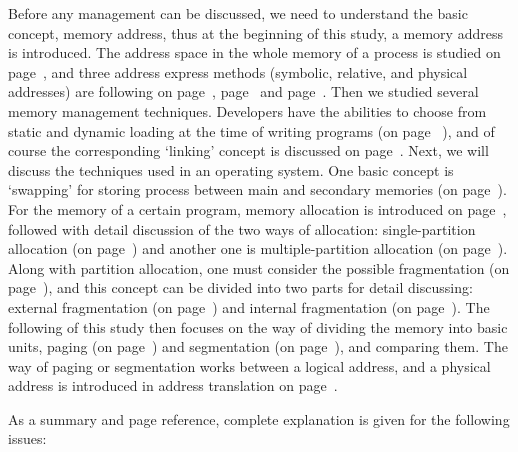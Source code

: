 \documentclass[doc,natbib,12pt]{apa6}
\begin{document}
	Before any management can be discussed, we need to understand the basic concept, memory address, thus at the beginning of this study, a memory address is introduced. The address space in the whole memory of a process is studied on page~\pageref{chp:processAddressSpace}, and three address express methods (symbolic, relative, and physical addresses)  are following on page~\pageref{chp:symbolicAddress}, page~\pageref{chp:relativeAddress} and page~\pageref{chp:physicalAddress}. Then we studied several memory management techniques. Developers have the abilities to choose from static and dynamic loading at the time of writing programs (on page~\pageref{chp:staticDynamicLoading} ), and of course the corresponding `linking' concept is discussed on page~\pageref{chp:staticDynamicLinking}. Next, we will discuss the techniques used in an operating system. One basic concept is `swapping' for storing process between main and secondary memories (on page~\pageref{chp:swapping}). For the memory of a certain program, memory allocation is introduced on page~\pageref{chp:memoryAllocation}, followed with detail discussion of the two ways of allocation: single-partition allocation (on page~\pageref{chp:singlePartitionAllocation}) and another one is multiple-partition allocation (on page~\pageref{chp:MultiplePartitionAllocation}). Along with partition allocation, one must consider the possible fragmentation (on page~\pageref{chp:fragmentation}), and this concept can be divided into two parts for detail discussing: external fragmentation (on page~\pageref{chp:externalFragmentation}) and internal fragmentation (on page~\pageref{chp:internalFragmentation}). The following of this study then focuses on the way of dividing the memory into basic units, paging (on page~\pageref{chp:paging}) and segmentation (on page~\pageref{chp:segmentation}), and comparing them. The way of paging or segmentation works between a logical address, and a physical address is introduced in address translation on page~\pageref{chp:addressTranslation}.
	
	As a summary and page reference, complete explanation is given for the following issues:
	
\end{document}
